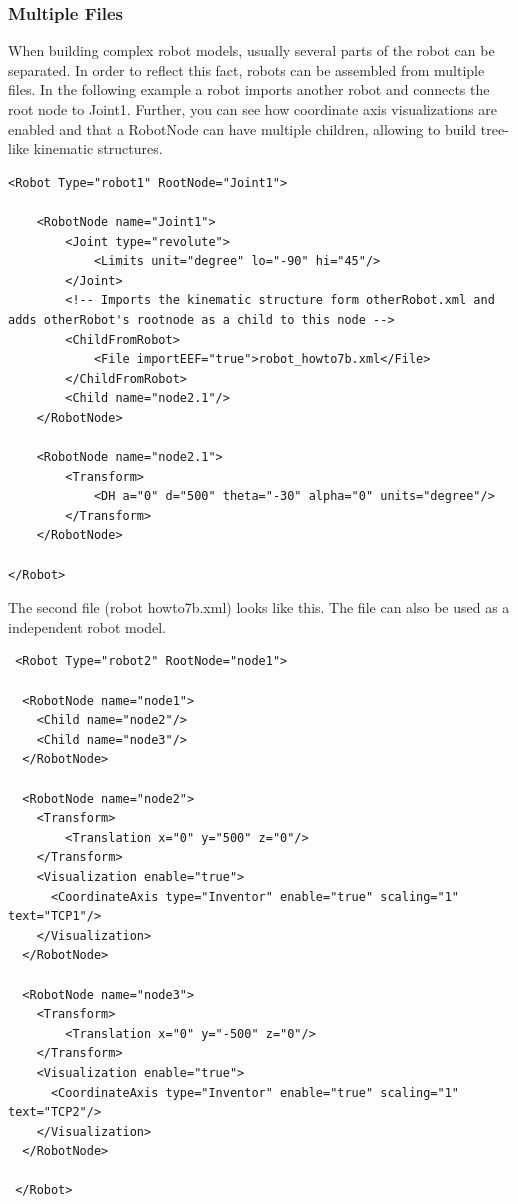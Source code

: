 \subsubsection{Multiple Files}
\par
When building complex robot models, usually several parts of the robot can be separated. In order to reflect this fact, robots can be assembled from multiple files. In the following example a robot imports another robot and connects the root node to Joint1. Further, you can see how coordinate axis visualizations are enabled and that a RobotNode can have multiple children, allowing to build tree-like kinematic structures. 
\par
\begin{lstlisting}
<Robot Type="robot1" RootNode="Joint1">

    <RobotNode name="Joint1">
        <Joint type="revolute">
            <Limits unit="degree" lo="-90" hi="45"/>
        </Joint>
        <!-- Imports the kinematic structure form otherRobot.xml and adds otherRobot's rootnode as a child to this node -->
        <ChildFromRobot>
            <File importEEF="true">robot_howto7b.xml</File>
        </ChildFromRobot>
        <Child name="node2.1"/>
    </RobotNode>

    <RobotNode name="node2.1">
        <Transform>
            <DH a="0" d="500" theta="-30" alpha="0" units="degree"/>
        </Transform>
    </RobotNode>

</Robot>
\end{lstlisting}
\par
The second file (robot howto7b.xml) looks like this. The file can also be used as a independent robot model. 
 \par
 \begin{lstlisting}
 <Robot Type="robot2" RootNode="node1">
 
  <RobotNode name="node1">
    <Child name="node2"/>
    <Child name="node3"/>
  </RobotNode>
 
  <RobotNode name="node2">
    <Transform>
        <Translation x="0" y="500" z="0"/>
    </Transform>
    <Visualization enable="true">
      <CoordinateAxis type="Inventor" enable="true" scaling="1" text="TCP1"/>
    </Visualization>
  </RobotNode>
 
  <RobotNode name="node3">
    <Transform>
        <Translation x="0" y="-500" z="0"/>
    </Transform>
    <Visualization enable="true">
      <CoordinateAxis type="Inventor" enable="true" scaling="1" text="TCP2"/>
    </Visualization>
  </RobotNode>
 
 </Robot>
 \end{lstlisting}
